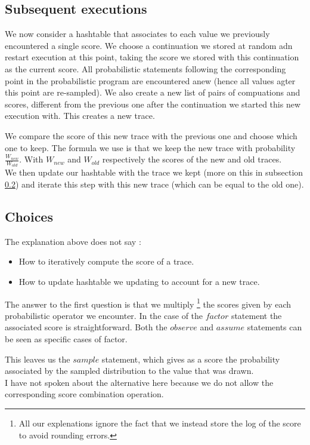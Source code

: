 \documentclass{article}
\newcommand\SC[1]{{\color{violet}{\it \bf Simon :} #1}}
\begin{document}
	\subsection{Subsequent executions}

	We now consider a hashtable that associates to each value we previously encountered a single score. 
	We choose a continuation we stored at random adn restart execution at this point, taking the score we stored with this continuation as the current score. 
	All probabilistic statements following the corresponding point in the probabilistic program are encountered anew (hence all values agter this point are re-sampled).
	We also create a new list of pairs of compuations and scores, different from the previous one after the continuation we started this new execution with.
	This creates a new trace.

	We compare the score of this new trace with the previous one and choose which one to keep.
	The formula we use is that we keep the new trace with probability $\frac{W_{new}}{W_{old}}$. 
	With $W_{new}$ and $W_{old}$ respectively the scores of the new and old traces. \\

	We then update our hashtable with the trace we kept (more on this in subsection \ref{subseq:choice}) and iterate this step with this new trace (which can be equal to the old one).

	\subsection{Choices}
	\label{subseq:choice}

	The explanation above does not say :
	\begin{itemize}
	  \item How to iteratively compute the score of a trace.
	  \item How to update hashtable we updating to account for a new trace.
	\end{itemize}

	The answer to the first question is that we multiply 
	\footnote{All our explenations ignore the fact that we instead store the log of the score to avoid rounding errors.}
	the scores given by each probabilistic operator we encounter.
	In the case of the $factor$ statement the associated score is straightforward. 
	Both the $observe$ and $assume$ statements can be seen as specific cases of factor.

	This leaves us the $sample$ statement, which gives as a score the probability associated by the sampled distribution to the value that was drawn. \\
	\SC{I have not spoken about the alternative here because we do not allow the corresponding score combination operation.}
\end{document}
